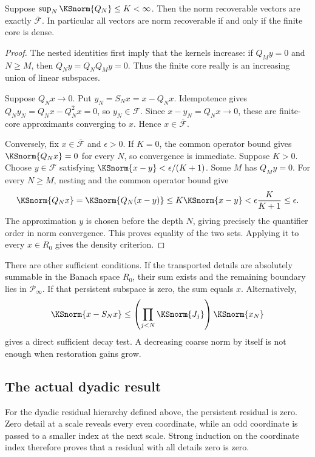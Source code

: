 \begin{KStheorem}\label{KS:KS27}
Suppose \(\sup_N\KSnorm{Q_N}\le K<\infty\). Then the norm recoverable vectors are exactly \(\overline{\mathcal F}\). In particular all vectors are norm recoverable if and only if the finite core is dense.
\end{KStheorem}
\begin{proof}
The nested identities first imply that the kernels increase: if $Q_My=0$ and $N\ge M$, then $Q_Ny=Q_NQ_My=0$. Thus the finite core really is an increasing union of linear subspaces.

Suppose $Q_Nx\to0$. Put $y_N=S_Nx=x-Q_Nx$. Idempotence gives $Q_Ny_N=Q_Nx-Q_N^2x=0$, so $y_N\in\mathcal F$. Since $x-y_N=Q_Nx\to0$, these are finite-core approximants converging to $x$. Hence $x\in\overline{\mathcal F}$.

Conversely, fix $x\in\overline{\mathcal F}$ and $\epsilon>0$. If $K=0$, the common operator bound gives $\KSnorm{Q_Nx}=0$ for every $N$, so convergence is immediate. Suppose $K>0$. Choose $y\in\mathcal F$ satisfying $\KSnorm{x-y}<\epsilon/(K+1)$. Some $M$ has $Q_My=0$. For every $N\ge M$, nesting and the common operator bound give
\[
 \KSnorm{Q_Nx}=\KSnorm{Q_N(x-y)}\le K\KSnorm{x-y}
 <\epsilon\frac{K}{K+1}\le\epsilon.
\]
The approximation $y$ is chosen before the depth $N$, giving precisely the quantifier order in norm convergence. This proves equality of the two sets. Applying it to every $x\in R_0$ gives the density criterion.
\end{proof}
There are other sufficient conditions. If the transported details are absolutely summable in the Banach space \(R_0\), their sum exists and the remaining boundary lies in \(\mathcal P_\infty\). If that persistent subspace is zero, the sum equals \(x\). Alternatively,
\[
 \KSnorm{x-S_Nx}\le\left(\prod_{j<N}\KSnorm{J_j}\right)\KSnorm{x_N}
\]
gives a direct sufficient decay test. A decreasing coarse norm by itself is not enough when restoration gains grow.

\subsection{The actual dyadic result}
For the dyadic residual hierarchy defined above, the persistent residual is zero. Zero detail at a scale reveals every even coordinate, while an odd coordinate is passed to a smaller index at the next scale. Strong induction on the coordinate index therefore proves that a residual with all details zero is zero.

